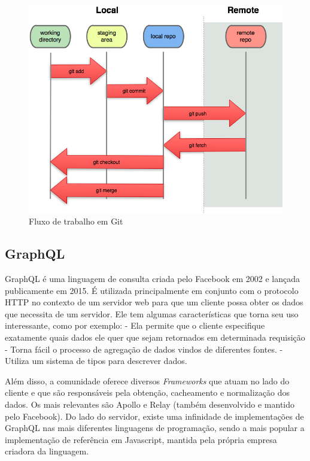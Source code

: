         	\begin{figure}[htb]
        		\caption{\label{fig_git2}Fluxo de trabalho em Git}
        		\begin{center}
        		\includegraphics[scale=1]{pictures/GIT2.png}
        		\end{center}
        	\end{figure}
        	
    	\subsection{GraphQL}
            GraphQL é uma linguagem de consulta criada pelo Facebook em 2002 e lançada publicamente em 2015. É utilizada principalmente em conjunto com o protocolo HTTP no contexto de um servidor web para que um cliente possa obter os dados que necessita de um servidor.
            Ele tem algumas características que torna seu uso interessante, como por exemplo:
            - Ela permite que o cliente especifique exatamente quais dados ele quer que sejam retornados em determinada requisição
            - Torna fácil o processo de agregação de dados vindos de diferentes fontes.
            - Utiliza um sistema de tipos para descrever dados.
    
            Além disso, a comunidade oferece diversos \textit{Frameworks} que atuam no lado do cliente e que são responsáveis pela obtenção, cacheamento e normalização dos dados. Os mais relevantes são Apollo e Relay (também desenvolvido e mantido pelo Facebook). Do lado do servidor, existe uma infinidade de implementações de GraphQL nas mais diferentes linguagens de programação, sendo a mais popular a implementação de referência em Javascript, mantida pela própria empresa criadora da linguagem.
        
